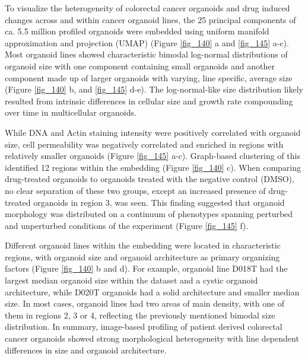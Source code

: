 \begin{flushleft}
To visualize the heterogeneity of colorectal cancer organoids and drug induced changes across and within cancer organoid lines, the 25 principal components of  ca. 5.5 million profiled organoids were embedded using uniform manifold approximation and projection (UMAP) (Figure \ref{fig_140} a and \ref{fig_145} a-c). Most organoid lines showed characteristic bimodal log-normal distributions of organoid size with one component containing small organoids and another component made up of larger organoids with varying, line specific, average size (Figure \ref{fig_140} b, and \ref{fig_145} d-e). The log-normal-like size distribution likely resulted from intrinsic differences in cellular size and growth rate compounding over time in multicellular organoids. 

\bigbreak
While DNA and Actin staining intensity were positively correlated with organoid size, cell permeability was negatively correlated and enriched in regions with relatively smaller organoids (Figure \ref{fig_145} a-c). Graph-based clustering of this identified 12 regions within the embedding (Figure \ref{fig_140} c). When comparing drug-treated organoids to organoids treated with the negative control (DMSO), no clear separation of these two groups, except an increased presence of drug-treated organoids in region 3,  was seen. This finding suggested that organoid morphology was distributed on a continuum of phenotypes spanning perturbed and unperturbed conditions of the experiment (Figure \ref{fig_145} f). 
\bigbreak

Different organoid lines within the embedding were located in characteristic regions, with organoid size and organoid architecture as primary organizing factors (Figure \ref{fig_140} b and d). For example, organoid line D018T had the largest median organoid size within the dataset and a cystic organoid architecture, while D020T organoids had a solid architecture and smaller median size. In most cases, organoid lines had two areas of main density, with one of them in regions 2, 3 or 4, reflecting the previously mentioned bimodal size distribution. In summary, image-based profiling of patient derived colorectal cancer organoids showed strong morphological heterogeneity with line dependent differences in size and organoid architecture.


\end{flushleft}

